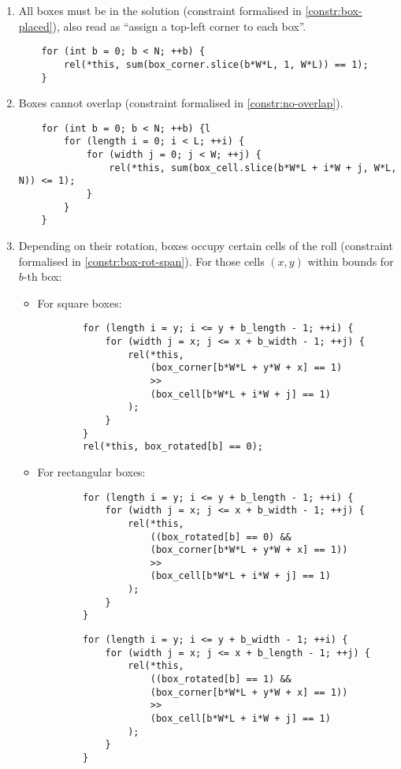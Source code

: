 \begin{enumerate}
    \item All boxes must be in the solution (constraint formalised in
    \ref{constr:box-placed}), also read as ``assign a top-left corner
    to each box''.
    
	{\NOINDENT \begin{lstlisting}
    for (int b = 0; b < N; ++b) {
		rel(*this, sum(box_corner.slice(b*W*L, 1, W*L)) == 1);
	}
	\end{lstlisting}}
    
    \item Boxes cannot overlap (constraint formalised in \ref{constr:no-overlap}).
    
    {\NOINDENT \begin{lstlisting}
    for (int b = 0; b < N; ++b) {l
		for (length i = 0; i < L; ++i) {
			for (width j = 0; j < W; ++j) {
				rel(*this, sum(box_cell.slice(b*W*L + i*W + j, W*L, N)) <= 1);
			}
		}
	}
	\end{lstlisting}}
    
    \item Depending on their rotation, boxes occupy certain cells of the roll
    (constraint formalised in \ref{constr:box-rot-span}). For those cells $(x,y)$
    within bounds for $b$-th box:

	\begin{itemize}
		\item For square boxes:
		{\NOINDENT \begin{lstlisting}
		for (length i = y; i <= y + b_length - 1; ++i) {
			for (width j = x; j <= x + b_width - 1; ++j) {
				rel(*this,
					(box_corner[b*W*L + y*W + x] == 1)
					>>
					(box_cell[b*W*L + i*W + j] == 1)
				);
			}
		}
		rel(*this, box_rotated[b] == 0);
		\end{lstlisting}}
		
		\item For rectangular boxes:
		{\NOINDENT \begin{lstlisting}
		for (length i = y; i <= y + b_length - 1; ++i) {
			for (width j = x; j <= x + b_width - 1; ++j) {
				rel(*this,
					((box_rotated[b] == 0) &&
					(box_corner[b*W*L + y*W + x] == 1))
					>>
					(box_cell[b*W*L + i*W + j] == 1)
				);
			}
		}
		\end{lstlisting}}
		{\NOINDENT \begin{lstlisting}
		for (length i = y; i <= y + b_width - 1; ++i) {
			for (width j = x; j <= x + b_length - 1; ++j) {
				rel(*this,
					((box_rotated[b] == 1) &&
					(box_corner[b*W*L + y*W + x] == 1))
					>>
					(box_cell[b*W*L + i*W + j] == 1)
				);
			}
		}
		\end{lstlisting}}
	\end{itemize}
    

\end{enumerate}
